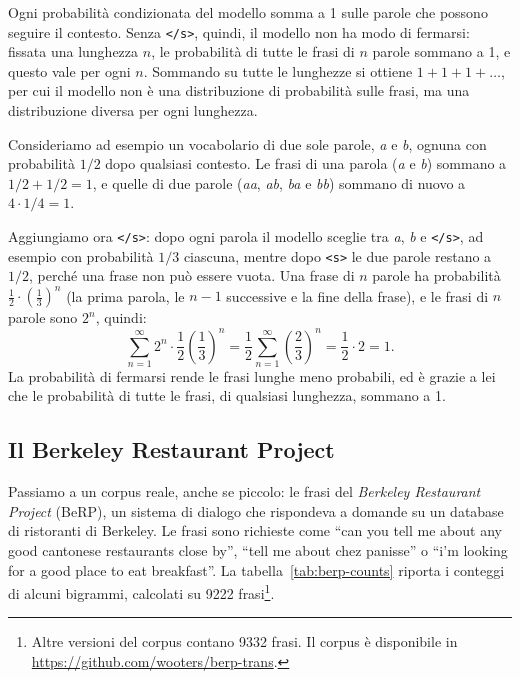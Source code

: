\begin{osservazione}
Ogni probabilità condizionata del modello somma a 1 sulle parole che possono seguire il contesto. Senza \texttt{</s>}, quindi, il modello non ha modo di fermarsi: fissata una lunghezza $n$, le probabilità di tutte le frasi di $n$ parole sommano a 1, e questo vale per ogni $n$. Sommando su tutte le lunghezze si ottiene $1 + 1 + 1 + \dots$, per cui il modello non è una distribuzione di probabilità sulle frasi, ma una distribuzione diversa per ogni lunghezza.

Consideriamo ad esempio un vocabolario di due sole parole, \textit{a} e \textit{b}, ognuna con probabilità $1/2$ dopo qualsiasi contesto. Le frasi di una parola (\textit{a} e \textit{b}) sommano a $1/2 + 1/2 = 1$, e quelle di due parole (\textit{aa}, \textit{ab}, \textit{ba} e \textit{bb}) sommano di nuovo a $4 \cdot 1/4 = 1$.

Aggiungiamo ora \texttt{</s>}: dopo ogni parola il modello sceglie tra \textit{a}, \textit{b} e \texttt{</s>}, ad esempio con probabilità $1/3$ ciascuna, mentre dopo \texttt{<s>} le due parole restano a $1/2$, perché una frase non può essere vuota. Una frase di $n$ parole ha probabilità $\frac{1}{2} \cdot \left(\frac{1}{3}\right)^n$ (la prima parola, le $n - 1$ successive e la fine della frase), e le frasi di $n$ parole sono $2^n$, quindi:
\[
\sum_{n=1}^{\infty} 2^n \cdot \frac{1}{2} \left(\frac{1}{3}\right)^n = \frac{1}{2} \sum_{n=1}^{\infty} \left(\frac{2}{3}\right)^n = \frac{1}{2} \cdot 2 = 1.
\]
La probabilità di fermarsi rende le frasi lunghe meno probabili, ed è grazie a lei che le probabilità di tutte le frasi, di qualsiasi lunghezza, sommano a 1.
\end{osservazione}

\subsection{Il Berkeley Restaurant Project}
Passiamo a un corpus reale, anche se piccolo: le frasi del \textit{Berkeley Restaurant Project} (BeRP), un sistema di dialogo che rispondeva a domande su un database di ristoranti di Berkeley. Le frasi sono richieste come \enquote{can you tell me about any good cantonese restaurants close by}, \enquote{tell me about chez panisse} o \enquote{i'm looking for a good place to eat breakfast}. La tabella~\ref{tab:berp-counts} riporta i conteggi di alcuni bigrammi, calcolati su 9222 frasi\footnote{Altre versioni del corpus contano 9332 frasi. Il corpus è disponibile in \url{https://github.com/wooters/berp-trans}.}.

